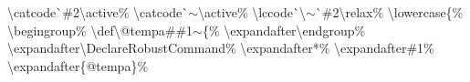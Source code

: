 \begin{linenumbers}
\hspace*{1.2em}\textbackslash catcode\`{}\#2\textbackslash active\%\newline
\hspace*{1.2em}\textbackslash catcode\`{}$\sim$\textbackslash active\%\newline
\hspace*{1.2em}\textbackslash lccode\`{}\textbackslash $\sim$\`{}\#2\textbackslash relax\%\newline
\hspace*{1.2em}\textbackslash lowercase\{\%\newline
\hspace*{2.4em}\textbackslash begingroup\%\newline
\hspace*{2.4em}\textbackslash def\textbackslash @tempa\#\#1$\sim$\{\%\newline
\hspace*{3.6em}\textbackslash expandafter\textbackslash endgroup\%\newline
\hspace*{3.6em}\textbackslash expandafter\textbackslash DeclareRobustCommand\%\newline
\hspace*{3.6em}\textbackslash expandafter*\%\newline
\hspace*{3.6em}\textbackslash expandafter\#1\%\newline
\hspace*{3.6em}\textbackslash expandafter\{@tempa\}\%\newline

\end{linenumbers}
